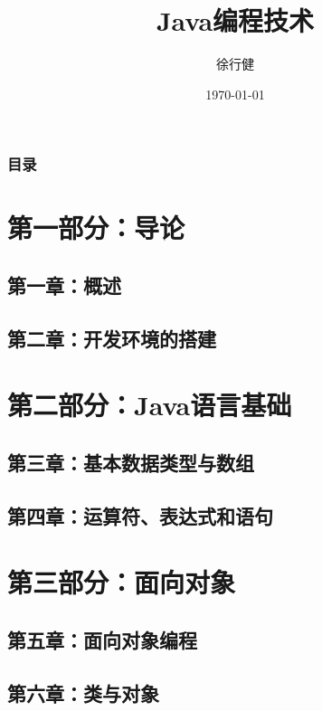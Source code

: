 \documentclass[xcolor=x11names,compress]{ctexbeamer}
\title{Java编程技术}
\author{徐行健}
\institute
{
  计算机与信息工程学院\\
  内蒙古师范大学
}
\date{\today}
\begin{document}
\maketitle

\begin{frame}[t]
  \frametitle{目录}
    \begin{multicols}{2}
      \tableofcontents
    \end{multicols}
\end{frame}

\section[第一部分：导论]{第一部分：导论}
\subsection[第一章：概述]{第一章：概述}


\subsection[第二章：开发环境的搭建]{第二章：开发环境的搭建}


\section[第二部分：Java语言基础]{第二部分：Java语言基础}
\subsection[第三章：基本数据类型与数组]{第三章：基本数据类型与数组}


\subsection[第四章：运算符、表达式和语句]{第四章：运算符、表达式和语句}



\section[第三部分：面向对象]{第三部分：面向对象}
\subsection[第五章：面向对象编程]{第五章：面向对象编程}


\subsection[第六章：类与对象]{第六章：类与对象}

\end{document}
